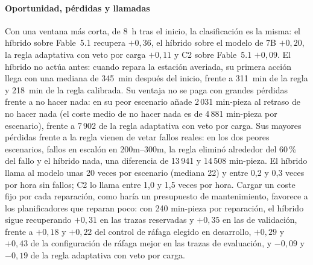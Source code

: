 \documentclass[preprint,11pt]{elsarticle}
\begin{document}
\paragraph{Oportunidad, pérdidas y llamadas}
Con una ventana más corta, de 8~h tras el inicio, la clasificación es la misma: el híbrido sobre Fable~5.1 recupera $+0{,}36$, el híbrido sobre el modelo de 7B $+0{,}20$, la regla adaptativa con veto por carga $+0{,}11$ y C2 sobre Fable~5.1 $+0{,}09$. El híbrido no actúa antes: cuando repara la estación averiada, su primera acción llega con una mediana de 345~min después del inicio, frente a 311~min de la regla y 218~min de la regla calibrada. Su ventaja no se paga con grandes pérdidas frente a no hacer nada: en su peor escenario añade 2\,031 min-pieza al retraso de no hacer nada (el coste medio de no hacer nada es de 4\,881 min-pieza por escenario), frente a 7\,902 de la regla adaptativa con veto por carga. Sus mayores pérdidas frente a la regla vienen de vetar fallos reales: en los dos peores escenarios, fallos en escalón en 200m--300m, la regla eliminó alrededor del 60\,\% del fallo y el híbrido nada, una diferencia de 13\,941 y 14\,508 min-pieza. El híbrido llama al modelo unas 20 veces por escenario (mediana 22) y entre 0{,}2 y 0{,}3 veces por hora sin fallos; C2 lo llama entre 1{,}0 y 1{,}5 veces por hora. Cargar un coste fijo por cada reparación, como haría un presupuesto de mantenimiento, favorece a los planificadores que reparan poco: con 240 min-pieza por reparación, el híbrido sigue recuperando $+0{,}31$ en las trazas reservadas y $+0{,}35$ en las de validación, frente a $+0{,}18$ y $+0{,}22$ del control de ráfaga elegido en desarrollo, $+0{,}29$ y $+0{,}43$ de la configuración de ráfaga mejor en las trazas de evaluación, y $-0{,}09$ y $-0{,}19$ de la regla adaptativa con veto por carga.
\end{document}
